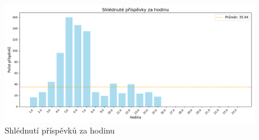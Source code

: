 \documentclass[11pt, a4paper]{article}
\begin{document}
\begin{figure}[h]
    \centering
    \includegraphics[width=\linewidth]{Shlédnuté_příspěvky_za_hodinu.png}
    \caption{Shlédnutí příspěvků za hodinu}
    \label{fig:Shlédnuté_příspěvky_za_hodinu}
\end{figure}
\end{document}
